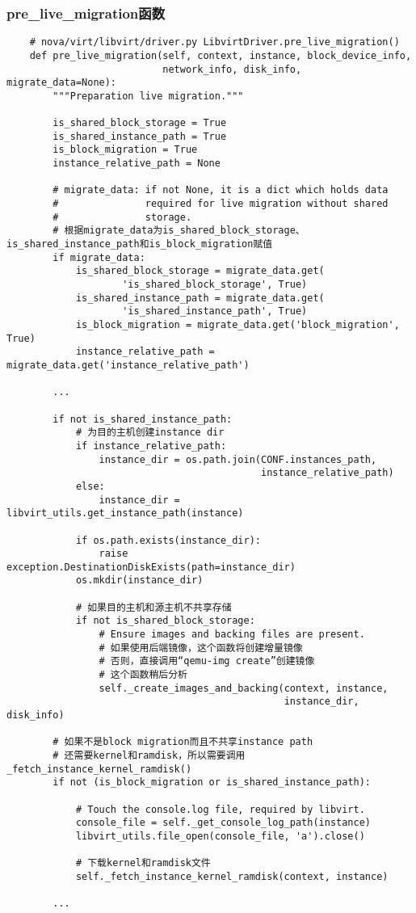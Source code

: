 \documentclass[a4paper,left=1.5cm,right=1.5cm,11pt]{article}
\begin{document}
\subsubsection{pre\_live\_migration函数}
	\begin{lstlisting}
    # nova/virt/libvirt/driver.py LibvirtDriver.pre_live_migration()
    def pre_live_migration(self, context, instance, block_device_info,
                           network_info, disk_info, migrate_data=None):
        """Preparation live migration."""
		
        is_shared_block_storage = True
        is_shared_instance_path = True
        is_block_migration = True
        instance_relative_path = None

		# migrate_data: if not None, it is a dict which holds data
        #               required for live migration without shared
        #               storage.
		# 根据migrate_data为is_shared_block_storage、is_shared_instance_path和is_block_migration赋值
        if migrate_data:
            is_shared_block_storage = migrate_data.get(
                    'is_shared_block_storage', True)
            is_shared_instance_path = migrate_data.get(
                    'is_shared_instance_path', True)
            is_block_migration = migrate_data.get('block_migration', True)
            instance_relative_path = migrate_data.get('instance_relative_path')

        ...

        if not is_shared_instance_path:
			# 为目的主机创建instance dir
            if instance_relative_path:
                instance_dir = os.path.join(CONF.instances_path,
                                            instance_relative_path)
            else:
                instance_dir = libvirt_utils.get_instance_path(instance)

            if os.path.exists(instance_dir):
                raise exception.DestinationDiskExists(path=instance_dir)
            os.mkdir(instance_dir)

			# 如果目的主机和源主机不共享存储
            if not is_shared_block_storage:
                # Ensure images and backing files are present.
				# 如果使用后端镜像，这个函数将创建增量镜像
				# 否则，直接调用“qemu-img create”创建镜像
				# 这个函数稍后分析
                self._create_images_and_backing(context, instance,
                                                instance_dir, disk_info)

		# 如果不是block migration而且不共享instance path
		# 还需要kernel和ramdisk，所以需要调用_fetch_instance_kernel_ramdisk()
        if not (is_block_migration or is_shared_instance_path):

            # Touch the console.log file, required by libvirt.
            console_file = self._get_console_log_path(instance)
            libvirt_utils.file_open(console_file, 'a').close()

            # 下载kernel和ramdisk文件
            self._fetch_instance_kernel_ramdisk(context, instance)

		...
    \end{lstlisting}
\end{document}
